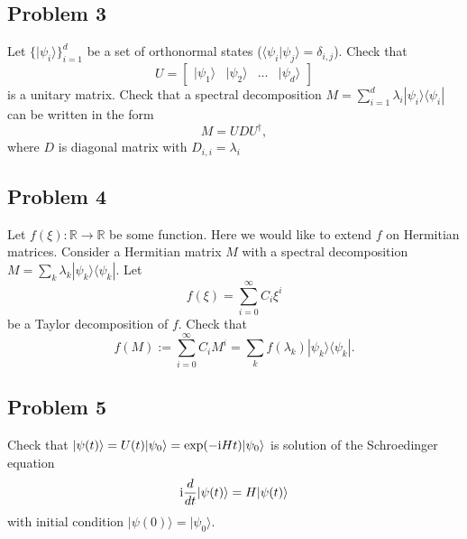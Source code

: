 \documentclass[a4paper,10pt]{article}
\newcommand{\ket}[1]{|#1\rangle}
\newcommand{\bra}[1]{\langle#1|}
\begin{document}
\subsection*{Problem 3}
Let $\{\ket{\psi_i}\}_{i=1}^d$ be a set of orthonormal states ($\bra{\psi_i}\psi_j\rangle=\delta_{i,j}$).
Check that
\begin{equation}
	U = \begin{bmatrix}
		\ket{\psi_1} & \ket{\psi_2} & \ldots & \ket{\psi_d}
	\end{bmatrix}
\end{equation}
is a unitary matrix.
Check that a spectral decomposition $M=\sum_{i=1}^d\lambda_i\ket{\psi_i}\bra{\psi_i}$ can be written in the form
\begin{equation}
	M = UDU^{\dagger},
\end{equation}
where $D$ is diagonal matrix with $D_{i,i}=\lambda_i$


\subsection*{Problem 4}
Let $f(\xi): \mathbb{R}\rightarrow \mathbb{R}$ be some function.
Here we would like to extend $f$ on Hermitian matrices.
Consider a Hermitian matrix $M$ with a spectral decomposition $M=\sum_k \lambda_k \ket{\psi_k}\bra{\psi_k}$.
Let
\begin{equation}
	f(\xi) = \sum_{i=0}^{\infty}C_i\xi^i 
\end{equation}
be a Taylor decomposition of $f$.
Check that
\begin{equation}
	f(M) := \sum_{i=0}^{\infty}C_iM^i= \sum_k f(\lambda_k) \ket{\psi_k}\bra{\psi_k}.
\end{equation}


\subsection*{Problem 5}
Check that $\ket{\psi(t)}=U(t)\ket{\psi_0}=\exp({-{\rm i}Ht})\ket{\psi_0}$ is solution of the Schroedinger equation
\begin{equation}
	{\rm i}\frac{d}{dt}\ket{\psi(t)}=H\ket{\psi(t)}
\end{equation}
with initial condition $\ket{\psi(0)}=\ket{\psi_0}$.
\end{document}
